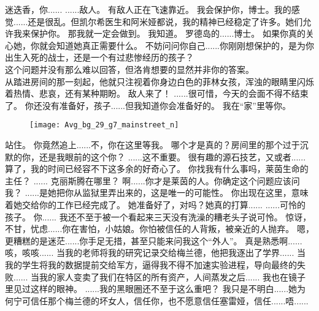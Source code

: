 \documentclass[openany]{book}
\begin{document}
\begin{dialogue}
     迷迭香，你......
     ......敌人。
     有敌人正在飞速靠近。
     我会保护你，博士。我的感觉......还是很乱。但凯尔希医生和阿米娅都说，我的精神已经稳定了许多。她们允许我来保护你。
     那我就一定会做到。
     我知道。
     罗德岛的......博士。
     如果你真的关心她，你就会知道她真正需要什么。
     不妨问问你自己......你刚刚想保护的，是为你出生入死的战士，还是一个有过悲惨经历的孩子？\\
    这个问题并没有那么难以回答，但洛肯想要的显然并非你的答案。\\
    从踏进房间的那一刻起，他就只注视着你身边白色的菲林女孩，浑浊的眼睛里闪烁着热情、悲哀，还有某种期盼。
     敌人来了！
     ......很可惜，今天的会面不得不结束了。
     你还没有准备好，孩子......但我知道你会准备好的。
     我在“家”里等你。
    \begin{figure}[h]
        \centering
        \texttt{[image: Avg\_bg\_29\_g7\_mainstreet\_n]}
    \end{figure}
     站住。
     你竟然追上......不，你在这里等我。
     哪个才是真的？房间里的那个过于沉默的你，还是我眼前的这个你？
     ......这不重要。
     很有趣的源石技艺，又或者......算了，我的时间已经容不下这多余的好奇心了。
     你找我有什么事吗，莱茵生命的主任？
     ......
     克丽斯腾在哪里？
     啊......你才是莱茵的人。你确定这个问题应该问我？
     ......是她把你从监狱里弄出来的，这是唯一的可能性。
     你出现在这里，意味着她交给你的工作已经完成了。
     她准备好了，对吗？她真的打算......
     ......可怜的孩子。
     你......
     我还不至于被一个看起来三天没有洗澡的糟老头子说可怜。
     惊讶，不甘，忧虑......你在害怕，小姑娘。你怕被信任的人背叛，被亲近的人抛弃。
     嗯，更糟糕的是迷茫......你手足无措，甚至只能来问我这个“外人”。
     真是熟悉啊......咳，咳咳......
     当我的老师将我的研究记录交给梅兰德，他把我逐出了学界......
     当我的学生将我的数据提前交给军方，逼得我不得不加速实验进程，导向最终的失败......
     当我的家人变卖了我们在特区的所有资产，人间蒸发之后......
     我也在镜子里见过这样的眼神。
     ......我的黑眼圈还不至于这么重吧？
     我只是不明白......她为何宁可信任那个梅兰德的坏女人，信任你，也不愿意信任塞雷娅，信任......唔......

\end{dialogue}
\end{document}
